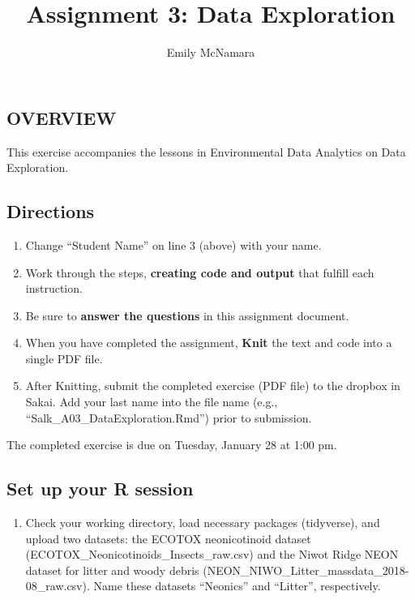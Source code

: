 \documentclass[]{article}
\title{Assignment 3: Data Exploration}
\author{Emily McNamara}
\date{}
\providecommand{\tightlist}{%
  \setlength{\itemsep}{0pt}\setlength{\parskip}{0pt}}
\begin{document}
\maketitle

\subsection{OVERVIEW}\label{overview}

This exercise accompanies the lessons in Environmental Data Analytics on
Data Exploration.

\subsection{Directions}\label{directions}

\begin{enumerate}
\def\labelenumi{\arabic{enumi}.}
\tightlist
\item
  Change ``Student Name'' on line 3 (above) with your name.
\item
  Work through the steps, \textbf{creating code and output} that fulfill
  each instruction.
\item
  Be sure to \textbf{answer the questions} in this assignment document.
\item
  When you have completed the assignment, \textbf{Knit} the text and
  code into a single PDF file.
\item
  After Knitting, submit the completed exercise (PDF file) to the
  dropbox in Sakai. Add your last name into the file name (e.g.,
  ``Salk\_A03\_DataExploration.Rmd'') prior to submission.
\end{enumerate}

The completed exercise is due on Tuesday, January 28 at 1:00 pm.

\subsection{Set up your R session}\label{set-up-your-r-session}

\begin{enumerate}
\def\labelenumi{\arabic{enumi}.}
\tightlist
\item
  Check your working directory, load necessary packages (tidyverse), and
  upload two datasets: the ECOTOX neonicotinoid dataset
  (ECOTOX\_Neonicotinoids\_Insects\_raw.csv) and the Niwot Ridge NEON
  dataset for litter and woody debris
  (NEON\_NIWO\_Litter\_massdata\_2018-08\_raw.csv). Name these datasets
  ``Neonics'' and ``Litter'', respectively.
\end{enumerate}
\end{document}
